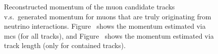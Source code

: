 \begin{figure}[]
\centering
{} 
\caption[\acrshort{mcs} and Range-Based Reconstructed Momentum]{Reconstructed momentum of the muon candidate tracks v.s.~generated momentum for muons that are truly originating from neutrino interactions. Figure~\protect{} shows the momentum estimated via \acrshort{mcs} (for all tracks), and Figure~\protect{} shows the momentum estimated via track length (only for contained tracks).}
\label{fig:mcs_len}
\end{figure}







